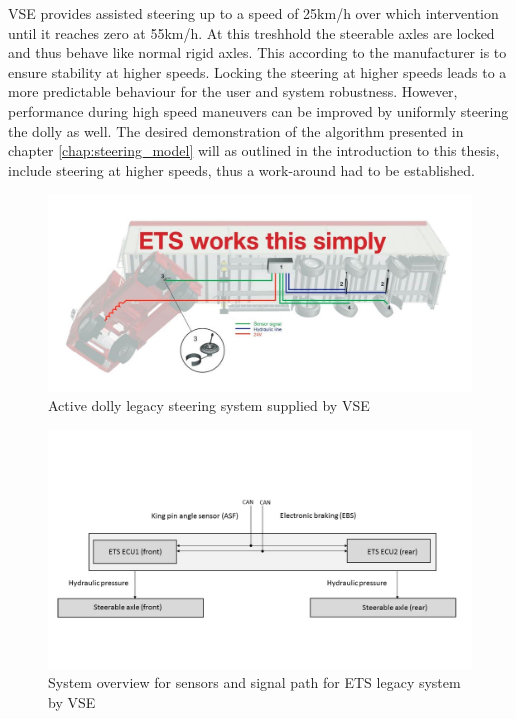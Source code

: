 \documentclass[ExampleMasters.tex]{subfiles}
\begin{document}
VSE provides assisted steering up to a speed of 25km/h over which intervention until it reaches zero at 55km/h. At this treshhold the steerable axles are locked and thus behave like normal rigid axles. This according to the manufacturer is to ensure stability at higher speeds.\cite{dolly_datasheet} Locking the steering at higher speeds leads to a more predictable behaviour for the user and system robustness. However, performance during high speed maneuvers can be improved by uniformly steering the dolly as well.\cite{performance_improvement} The desired demonstration of the algorithm presented in chapter \ref{chap:steering_model} will as outlined in the introduction to this thesis, include steering at higher speeds, thus a work-around had to be established.

\begin{figure}[h]
\centering
\includegraphics[width=1.0\linewidth]{figures/legacy_system_vse}
\caption[]{Active dolly legacy steering system supplied by VSE\cite{dolly_datasheet}}
\label{fig:legacy_system_vse}
\end{figure}

\begin{figure}[ph]
\centering
\includegraphics[width=1\linewidth]{figures/system_overview_ETS}

\caption{System overview for sensors and signal path for ETS legacy system by VSE}
\label{fig:system_overview_ETS}
\end{figure}
\end{document}
